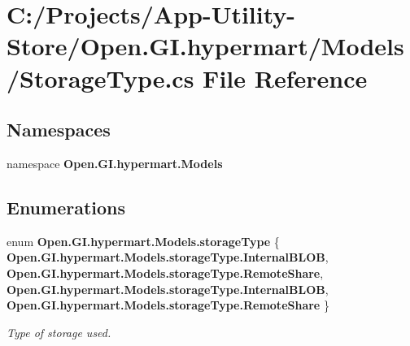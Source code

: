 \section{C\+:/\+Projects/\+App-\/\+Utility-\/\+Store/\+Open.G\+I.\+hypermart/\+Models/\+Storage\+Type.cs File Reference}
\label{_models_2_storage_type_8cs}
\subsection*{Namespaces}
\begin{DoxyCompactItemize}
\item 
namespace \textbf{ Open.\+G\+I.\+hypermart.\+Models}
\end{DoxyCompactItemize}
\subsection*{Enumerations}
\begin{DoxyCompactItemize}
\item 
enum \textbf{ Open.\+G\+I.\+hypermart.\+Models.\+storage\+Type} \{ \textbf{ Open.\+G\+I.\+hypermart.\+Models.\+storage\+Type.\+Internal\+B\+L\+OB}, 
\textbf{ Open.\+G\+I.\+hypermart.\+Models.\+storage\+Type.\+Remote\+Share}, 
\textbf{ Open.\+G\+I.\+hypermart.\+Models.\+storage\+Type.\+Internal\+B\+L\+OB}, 
\textbf{ Open.\+G\+I.\+hypermart.\+Models.\+storage\+Type.\+Remote\+Share}
 \}\begin{DoxyCompactList}\small\item\em Type of storage used. \end{DoxyCompactList}
\end{DoxyCompactItemize}
